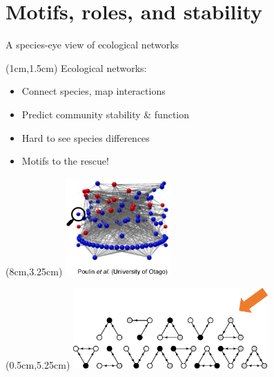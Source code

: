 \documentclass{beamer}
\begin{document}
\section*{Motifs, roles, and stability}
  \begin{frame}{A species-eye view of ecological networks}
      \begin{textblock*}{10cm}(1cm,1.5cm)
        Ecological networks:
        \begin{itemize}
          \item Connect species, map interactions
          \item Predict community stability \& function
          \item Hard to see species differences
          \item Motifs to the rescue!
        \end{itemize}
        \end{textblock*}

      \begin{textblock*}{5cm}(8cm,3.25cm)
        \includegraphics[width=4cm]{intro_figs/Otagoweb_closeup.eps}
        \end{textblock*} 

      \begin{textblock*}{7.5cm}(0.5cm,5.25cm)
        \includegraphics[width=7.5cm]{intro_figs/to_motifs.eps}
        \end{textblock*}       

    \end{frame}
\end{document}
